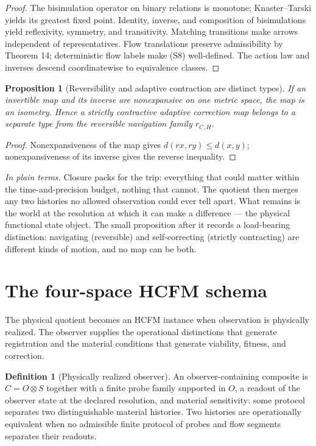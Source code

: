 \documentclass[11pt]{article}
\newtheorem{proposition}{Proposition}
\theoremstyle{definition}
\newtheorem{definition}{Definition}
\newcommand{\plainterms}{\emph{In plain terms.}}
\begin{document}
\begin{proof}
The bisimulation operator on binary relations is monotone; Knaster--Tarski yields its greatest fixed point. Identity, inverse, and composition of bisimulations yield reflexivity, symmetry, and transitivity. Matching transitions make arrows independent of representatives. Flow translations preserve admissibility by Theorem 14; deterministic flow labels make (S8) well-defined. The action law and inverses descend coordinatewise to equivalence classes.
\end{proof}

\begin{proposition}[Reversibility and adaptive contraction are distinct types]
\label{prop:reversibility-adaptive-contraction}
If an invertible map and its inverse are nonexpansive on one metric space, the map is an isometry. Hence a strictly contractive adaptive correction map belongs to a separate type from the reversible navigation family $r_{C,H}$.
\end{proposition}

\begin{proof}
Nonexpansiveness of the map gives $d(rx, ry) \leq d(x, y)$; nonexpansiveness of its inverse gives the reverse inequality.
\end{proof}

\noindent\plainterms{} Closure packs for the trip: everything that could matter within the time-and-precision budget, nothing that cannot. The quotient then merges any two histories no allowed observation could ever tell apart. What remains is the world at the resolution at which it can make a difference --- the physical functional state object. The small proposition after it records a load-bearing distinction: navigating (reversible) and self-correcting (strictly contracting) are different kinds of motion, and no map can be both.

\section{The four-space HCFM schema}

The physical quotient becomes an HCFM instance when observation is physically realized. The observer supplies the operational distinctions that generate registration and the material conditions that generate viability, fitness, and correction.

\begin{definition}[Physically realized observer]
An observer-containing composite is $C = O \otimes S$ together with a finite probe family supported in $O$, a readout of the observer state at the declared resolution, and material sensitivity: some protocol separates two distinguishable material histories. Two histories are operationally equivalent when no admissible finite protocol of probes and flow segments separates their readouts.
\end{definition}
\end{document}
